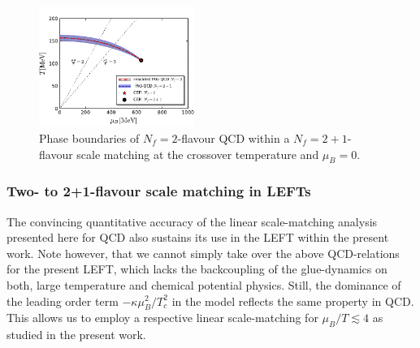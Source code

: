 \documentclass[%
reprint,
superscriptaddress,
showpacs,preprintnumbers,
amsmath,amssymb,
aps,
prd,
]{revtex4-1}
\begin{document}
%
\begin{figure}[t]
\includegraphics[width=0.45\textwidth]{QCD-scalematching}
\caption{Phase boundaries of $N_f=2$-flavour QCD within a $N_f=2+1$-flavour scale matching at the crossover temperature and $\mu_B=0$.}\label{fig:QCD-scalematching}
\end{figure}
%

\subsubsection{Two- to 2+1-flavour scale matching in LEFTs}	


	
The convincing quantitative accuracy of the linear scale-matching analysis presented here for QCD also sustains its use in the LEFT within the present work. Note however, that we cannot simply take over the above QCD-relations for the present LEFT, which lacks the backcoupling of the glue-dynamics on both, large temperature and chemical potential physics. Still, the dominance of the leading order term $-\kappa \mu_B^2/T_c^2$ in the model reflects the same property in QCD. This allows us to employ a respective linear scale-matching for $\mu_B/T\lesssim 4$ as studied in the present work. 
	
\end{document}
